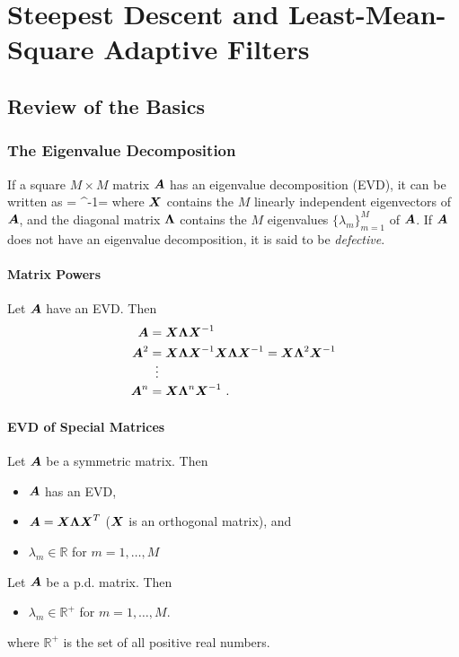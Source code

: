 \chapter{Steepest Descent and Least-Mean-Square Adaptive Filters}
\label{ch:SD_LMS}

\section{Review of the Basics}
\subsection{The Eigenvalue Decomposition}
If a square $M\times M$ matrix $\boldsymbol{A}$ has an eigenvalue decomposition (EVD), it can be written as
\bmath
   = ^{-1}\qquad\iff\qquad{}=
\emath
where $\boldsymbol{X}$ contains the $M$ linearly independent eigenvectors of $\boldsymbol{A}$, and the diagonal matrix $\boldsymbol{\Lambda}$ contains the $M$ eigenvalues $\{\lambda_m\}_{m=1}^M$ of $\boldsymbol{A}$. If $\boldsymbol{A}$ does not have an eigenvalue decomposition, it is said to be \textit{defective}.
\subsubsection{Matrix Powers}
Let $\boldsymbol{A}$ have an EVD. Then
\begin{align}
  \boldsymbol{A} & = \boldsymbol{X\Lambda X}^{-1}\\
  \boldsymbol{A}^2 & \underset{\vdots}{=} \boldsymbol{X\Lambda X}^{-1}\boldsymbol{X\Lambda X}^{-1}=\boldsymbol{X\Lambda}^2\boldsymbol{X}^{-1}\\
  \boldsymbol{A}^n &= \boldsymbol{X\Lambda}^n\boldsymbol{X}^{-1}\ .
\end{align}
\subsubsection{EVD of Special Matrices}
Let $\boldsymbol{A}$ be a symmetric matrix. Then
\begin{itemize}
  \item[] $\boldsymbol{A}$ has an EVD,
  \item[] $\boldsymbol{A}=\boldsymbol{X\Lambda X}^T$ ($\boldsymbol{X}$ is an orthogonal matrix), and
  \item[] $\lambda_m\in\mathbb{R}$ for $m=1,\ldots,M$
\end{itemize}
Let $\boldsymbol{A}$ be a p.d. matrix. Then
\begin{itemize}
  \item[] $\lambda_m\in\mathbb{R}^+$ for $m=1,\ldots,M$.
\end{itemize}
where $\mathbb{R}^+$ is the set of all positive real numbers.
